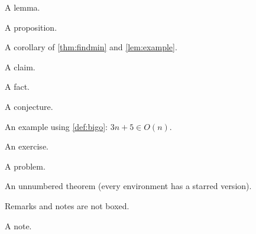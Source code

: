 \documentclass[11pt]{article}
\begin{document}
\begin{lemma}\label{lem:example}
  A lemma.
\end{lemma}

\begin{proposition}
  A proposition.
\end{proposition}

\begin{corollary}
  A corollary of \cref{thm:findmin} and \cref{lem:example}.
\end{corollary}

\begin{claim}
  A claim.
\end{claim}

\begin{fact}
  A fact.
\end{fact}

\begin{conjecture}
  A conjecture.
\end{conjecture}

\begin{example}
  An example using \cref{def:bigo}: $3n + 5 \in O(n)$.
\end{example}

\begin{exercise}
  An exercise.
\end{exercise}

\begin{problem}
  A problem.
\end{problem}

\begin{theorem*}
  An unnumbered theorem (every environment has a starred version).
\end{theorem*}

\begin{remark}
  Remarks and notes are not boxed.
\end{remark}

\begin{note}
  A note.
\end{note}
\end{document}
